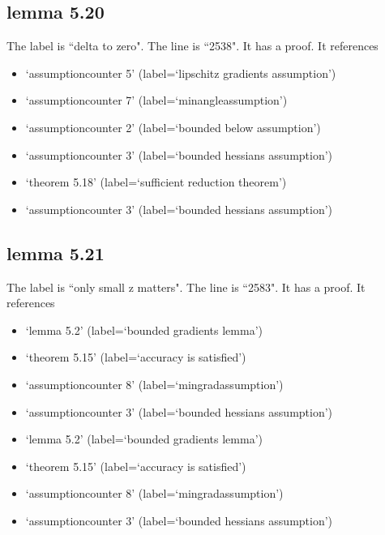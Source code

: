 \documentclass{article}
\begin{document}
\subsection{lemma 5.20}
The label is ``delta to zero".
The line is ``2538".
It has a proof.
It references \begin{itemize}
\item `assumptioncounter 5' (label=`lipschitz gradients assumption')
\item `assumptioncounter 7' (label=`minangleassumption')
\item `assumptioncounter 2' (label=`bounded below assumption')
\item `assumptioncounter 3' (label=`bounded hessians assumption')
\item `theorem 5.18' (label=`sufficient reduction theorem')
\item `assumptioncounter 3' (label=`bounded hessians assumption')
\end{itemize}
\subsection{lemma 5.21}
The label is ``only small z matters".
The line is ``2583".
It has a proof.
It references \begin{itemize}
\item `lemma 5.2' (label=`bounded gradients lemma')
\item `theorem 5.15' (label=`accuracy is satisfied')
\item `assumptioncounter 8' (label=`mingradassumption')
\item `assumptioncounter 3' (label=`bounded hessians assumption')
\item `lemma 5.2' (label=`bounded gradients lemma')
\item `theorem 5.15' (label=`accuracy is satisfied')
\item `assumptioncounter 8' (label=`mingradassumption')
\item `assumptioncounter 3' (label=`bounded hessians assumption')
\end{itemize}
\end{document}
